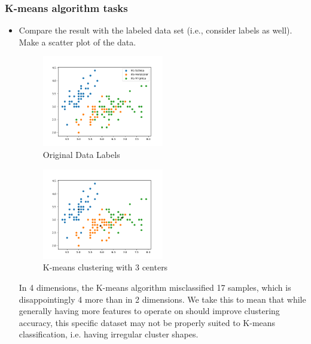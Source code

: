 \documentclass[a4paper]{article}
\begin{document}
	\subsubsection{K-means algorithm tasks}
	\begin{itemize}
		\item Compare the result with the labeled data set (i.e., consider labels as well). Make a scatter plot of the data.

	\begin{figure}[h]
		\begin{center}
			\includegraphics[width=0.5\textwidth]{4dim_data.png}
			\caption{Original Data Labels}
		\end{center}
	\end{figure}

	\begin{figure}[h]
		\begin{center}
			\includegraphics[width=0.5\textwidth]{kmeans_4dim.png}
			\caption{K-means clustering with 3 centers}
		\end{center}
	\end{figure}

	In 4 dimensions, the K-means algorithm misclassified 17 samples, which is disappointingly 4 more than in 2 dimensions.  We take this to mean that while generally having more features to operate on should improve clustering accuracy, this specific dataset may not be properly suited to K-means classification, i.e. having irregular cluster shapes.

\clearpage


\end{itemize}
\end{document}
